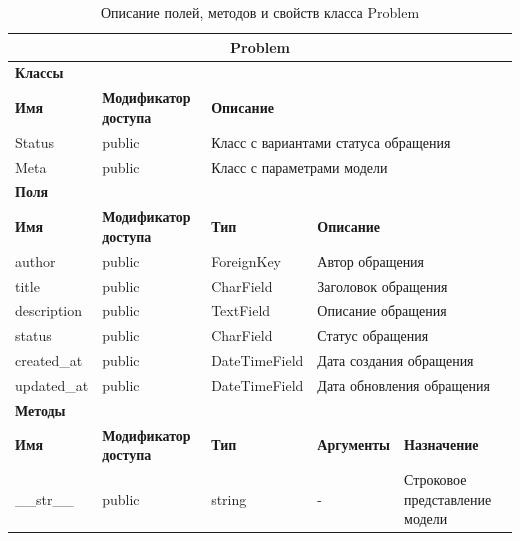 \documentclass{../includes/TechDoc}
\begin{document}
    \begin{table}[ht]
        \caption{\label{tab:class-Problem-table}Описание полей, методов и свойств класса Problem}
        \centering
        \begin{tabular}{|p{3.2cm}|p{3cm}|p{2.9cm}|p{2.9cm}|p{4cm}|}
            \hline
            \multicolumn{5}{|c|}{Problem} \\ \hline
            \multicolumn{5}{|l|}{\textbf{Классы}} \\ \hline
            \textbf{Имя} & \textbf{Модификатор доступа} & \multicolumn{3}{p{9.8cm}|}{\textbf{Описание}} \\ \hline
            Status & public & \multicolumn{3}{p{9.8cm}|}{Класс с вариантами статуса обращения} \\ \hline
            Meta & public & \multicolumn{3}{p{9.8cm}|}{Класс с параметрами модели} \\ \hline
            \multicolumn{5}{|l|}{\textbf{Поля}} \\ \hline
            \textbf{Имя} & \textbf{Модификатор доступа} & \textbf{Тип} & \multicolumn{2}{p{6.9cm}|}{\textbf{Описание}} \\ \hline
            author & public & ForeignKey & \multicolumn{2}{p{6.9cm}|}{Автор обращения} \\ \hline
            title & public & CharField & \multicolumn{2}{p{6.9cm}|}{Заголовок обращения} \\ \hline
            description & public & TextField & \multicolumn{2}{p{6.9cm}|}{Описание обращения} \\ \hline
            status & public & CharField & \multicolumn{2}{p{6.9cm}|}{Статус обращения} \\ \hline
            created\_at & public & DateTimeField & \multicolumn{2}{p{6.9cm}|}{Дата создания обращения} \\ \hline
            updated\_at & public & DateTimeField & \multicolumn{2}{p{6.9cm}|}{Дата обновления обращения} \\ \hline
            \multicolumn{5}{|l|}{\textbf{Методы}} \\ \hline
            \textbf{Имя} & \textbf{Модификатор доступа} & \textbf{Тип} & \textbf{Аргументы} & \textbf{Назначение} \\ \hline
            \_\_str\_\_ & public & string & - & Строковое представление модели \\ \hline
        \end{tabular}
    \end{table}
\end{document}
